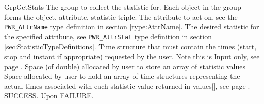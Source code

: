 \begin{prototype}{GrpGetStats}
			{\pInput}{The group to collect the statistic for. Each object in the group forms the object, attribute, statistic triple.}
			{\pInput}{The attribute to act on, see the \texttt{PWR_AttrName} type definition in section \ref{type:AttrName}.}
		{\pInput}{The desired statistic for the specified attribute, see \texttt{PWR_AttrStat} type definition in section \ref{sec:StatisticTypeDefinitions}.}
		{\pInput}{Time structure that must contain the times (start, stop and instant if appropriate) requested by the user. Note this is Input only, see page \pageref{type: TimePeriod}.}
			{\pOutput}{Space (of double) allocated by user to store an array of statistic values}
		{\pOutput}{Space allocated by user to hold an array of time structures representing the actual times associated with each statistic value returned in values[], see      page \pageref{type:TimePeriod}.}
	 		{SUCCESS.}
	 		{Upon FAILURE.}
\end{prototype}

